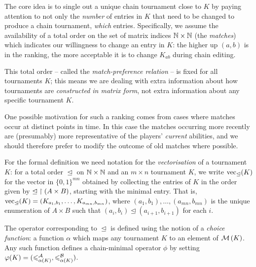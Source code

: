 The core idea is to single out a unique chain tournament close to $K$ by paying
attention to not only the \emph{number} of entries in $K$ that need to be
changed to produce a chain tournament, \emph{which} entries. Specifically, we
assume the availability of a total order on the set of matrix indices $\mathbb{N}
\times \mathbb{N}$ (the \emph{matches}) which indicates our willingness to change an
entry in $K$: the higher up $(a, b)$ is in the ranking, the more acceptable it
is to change $K_{ab}$ during chain editing.

This total order -- called the \emph{match-preference relation} -- is fixed for
all tournaments $K$; this means we are dealing with extra information about how
tournaments are \emph{constructed in matrix form}, not extra information about
any specific tournament $K$.

One possible motivation for such a ranking comes from cases where matches occur
at distinct points in time. In this case the matches occurring more recently
are (presumably) more representative of the players' \emph{current} abilities,
and we should therefore prefer to modify the outcome of old matches where
possible.

For the formal definition we need notation for the \emph{vectorisation} of a
tournament $K$: for a total order ${\trianglelefteq}$ on $\mathbb{N} \times \mathbb{N}$ and an
$m \times n$ tournament $K$, we write $\operatorname{vec}_{\trianglelefteq}(K)$ for the
vector in $\{0,1\}^{mn}$ obtained by collecting the entries of $K$ in the order
given by ${\trianglelefteq} \upharpoonright (A \times B)$,\footnotemark{} starting with the
minimal entry. That is, $\operatorname{vec}_{\trianglelefteq}(K) = (K_{a_1,b_1}, \ldots,
K_{a_{mn},b_{mn}})$, where $(a_1,b_1), \ldots, (a_{mn},b_{mn})$ is the unique
enumeration of $A \times B$ such that $(a_i,b_i) \trianglelefteq
(a_{i+1},b_{i+1})$ for each $i$.


The operator corresponding to $\trianglelefteq$ is defined using the notion of
a \emph{choice function}: a function $\alpha$ which maps any tournament $K$ to
an element of $\operatorname{\mathcal{M}}\left({K}\right)$. Any such function defines a chain-minimal operator
$\phi$ by setting $\varphi(K) = ({\leqslant^{\mathcal{A}}_{\alpha(K)}}, {\leqslant^{\mathcal{B}}_{\alpha(K)}})$.


